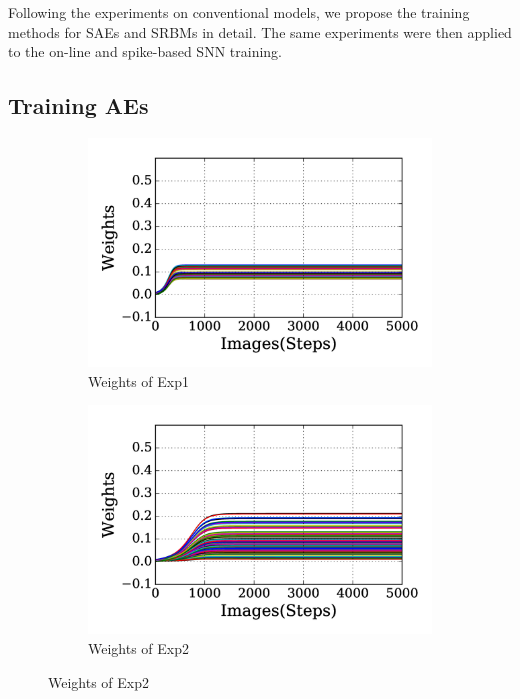Following the experiments on conventional models, we propose the training methods for SAEs and SRBMs in detail.
The same experiments were then applied to the on-line and spike-based SNN training.

\subsection[AEs]{Training AEs}
\label{subsec:exp_AE}
\begin{figure}
	\centering
	\begin{subfigure}[t]{0.48\textwidth}
		\includegraphics[width=\textwidth]{pics_sdlm/20_exp_AE/exp1_weights_non.png}
		\caption{Weights of Exp1}
	\end{subfigure}
	\begin{subfigure}[t]{0.48\textwidth}
		\includegraphics[width=\textwidth]{pics_sdlm/20_exp_AE/exp2_weights_non.png}
		\caption{Weights of Exp2}

\end{subfigure}
\end{figure}
